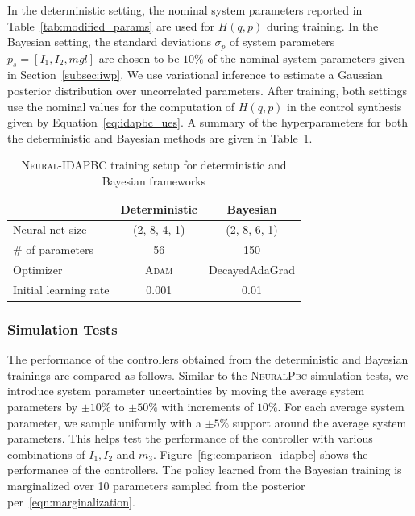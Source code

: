 In the deterministic setting, the nominal system parameters reported in
Table~\ref{tab:modified_params} are used for $H(q,p)$ during training. 
%
In the Bayesian setting, the standard deviations $\sigma_{p}$ of system
parameters $p_s = [I_1, I_2, mgl]$ are chosen to be $10\%$ of the nominal system
parameters given in Section~\ref{subsec:iwp}.
%
We use variational inference to estimate a Gaussian posterior distribution
over uncorrelated parameters.
%
After training, both settings use the nominal values for the computation of
$H(q,p)$ in the control synthesis given by Equation~\eqref{eq:idapbc_ues}.
%
A summary of the hyperparameters for both the deterministic and Bayesian methods
are given in Table~\ref{tab:training_setup_idapbc}. 
\begin{table}[tb]
    \centering
    \caption{\textsc{Neural-IDAPBC} training setup for deterministic and Bayesian frameworks}
    \begin{tabular}{lcc}
    \toprule
    & Deterministic & Bayesian \\
    \midrule
        Neural net size & (2, 8, 4, 1) & (2, 8, 6, 1)\\
        \# of parameters &  56  & 150\\
        Optimizer & \textsc{Adam} & DecayedAdaGrad\\
        Initial learning rate & 0.001 & 0.01\\
    \bottomrule
    \end{tabular}
    \label{tab:training_setup_idapbc}
\end{table}

\subsubsection{Simulation Tests} 
The performance of the controllers obtained from the deterministic and Bayesian
trainings are compared as follows.
%
%
Similar to the \textsc{NeuralPbc} simulation tests, we introduce system
parameter uncertainties by moving the average system parameters by $\pm
10\%$ to $\pm 50\%$ with increments of $10\%$. 
%
For each average system parameter, we sample uniformly with a $\pm 5\%$ support
around the average system parameters. 
%
This helps test the performance of the controller with various combinations of
$I_1, I_2$ and $m_3$.
%
%
%
Figure~\ref{fig:comparison_idapbc} shows the performance of the controllers.
The policy learned from the Bayesian training is marginalized over 10
parameters sampled from the posterior per~\eqref{eqn:marginalization}.

